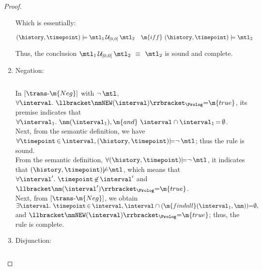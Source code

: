 \begin{proof}
\begin{enumerate}[itemsep=1.5em,leftmargin=!]
Which is essentially: 

{
\small 
\begin{align*}
(\history, \timepoint) &\models \mtl_1 \, \mathcal{U}_{[0, 0]} \,\mtl_2  & \m{iff}&~   (\history, \timepoint)\models\mtl_2 
\end{align*}}

Thus, the conclusion $\mtl_1  
\,\mathcal{U}_{[0, 0]} \,  \mtl_2$ $\equiv$ $\mtl_2$ is sound and complete. 

\item  Negation:
{
\small 
\begin{align*}

\end{align*}
\vspace{-1mm}
\begin{align*}

\end{align*}
\vspace{-8mm}
}

In $[\trans\text{-}\m{Neg}]$  with 
$\neg\,\mtl$, \\
$\forall \interval.~\llbracket \nmNEW(\interval) \rrbracket_{\Prolog} {=} \m{true}$, 
its premise indicates that \\ 
$\forall \interval_1.~ \nm(\interval_1), \m{and} ~ \interval \cap \interval_1 \,{=}\, \emptyset$. 
\\
Next, from the semantic definition, we have \\
$\forall  \timepoint\,{\in}\,\interval, 
(\history, \timepoint) {\models} \neg\,\mtl$; thus the rule is sound. \\
From the semantic definition, $\forall   
(\history, \timepoint) {\models} \neg\,\mtl$, it indicates that $ (\history, \timepoint){\not\models}\mtl$, 
which means that 
$\forall \interval'. ~ \timepoint\,{\not\in}\,\interval'$ and $\llbracket \nm(\interval^\prime) \rrbracket_{\Prolog} {=} \m{true}$. 
\\
Next, from $[\trans\text{-}\m{Neg}]$, 
we obtain  \\
$\exists\interval.~ \timepoint\,{\in}\,\interval, \interval \cap (\m{findall}(\interval_1, \nm)) {=} \emptyset,$ and $ \llbracket \nmNEW(\interval) \rrbracket_{\Prolog} {=} \m{true}$; 
thus, the rule is complete. 

\item Disjunction:
{
\small 
\begin{align*}

\end{align*}
\begin{align*}

\end{align*}
\vspace{2mm}
}


\end{enumerate}
\end{proof}
